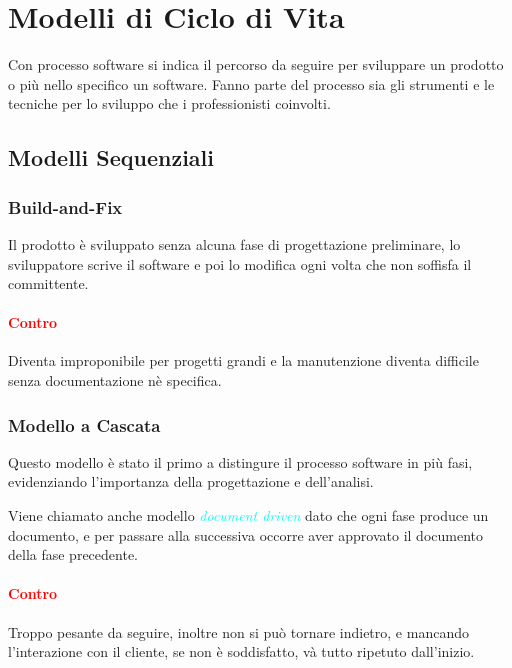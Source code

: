 \section{Modelli di Ciclo di Vita}

\begin{definition}
    Con processo software si indica il percorso da seguire per sviluppare un prodotto o più nello specifico un software.
    Fanno parte del processo sia gli strumenti e le tecniche per lo sviluppo che i professionisti coinvolti.
\end{definition}

\subsection{Modelli Sequenziali}

\subsubsection{Build-and-Fix}

Il prodotto è sviluppato senza alcuna fase di progettazione preliminare, lo sviluppatore scrive il software
e poi lo modifica ogni volta che non soffisfa il committente.

\paragraph{\textcolor{red}{Contro}}

Diventa improponibile per progetti grandi e la manutenzione diventa difficile senza documentazione nè specifica.

\subsubsection{Modello a Cascata}

Questo modello è stato il primo a distingure il processo software in più fasi, evidenziando l'importanza della progettazione e dell'analisi.

Viene chiamato anche modello \emph{\textcolor{cyan}{document driven}} dato che ogni fase produce un documento, e per passare alla successiva
occorre aver approvato il documento della fase precedente.

\paragraph{\textcolor{red}{Contro}} Troppo pesante da seguire, inoltre non si può tornare indietro, e mancando
l'interazione con il cliente, se non è soddisfatto, và tutto ripetuto dall'inizio.

